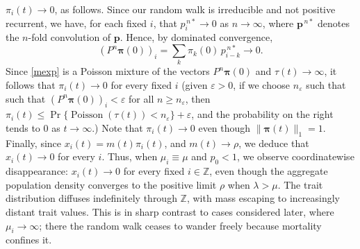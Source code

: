 \documentclass[12pt]{article}
\newcommand{\Z}{\ensuremath{\mathbb Z}}
\newcommand{\bp}{\boldsymbol{p}}
\newcommand{\bpi}{\boldsymbol{\pi}}
\begin{document}
$\pi_i(t)\to 0$, as follows.
Since our random walk is irreducible and not positive recurrent, 
we have, for each fixed $i$, that $p^{\,n*}_i \to 0$ as $n\to\infty$,
where $\bp^{\,n*}$ denotes the $n$-fold convolution of $\bp$.
Hence, by dominated convergence,
$$
(P^n\bpi(0))_i = \sum_k \pi_k(0)\,p^{\,n*}_{i-k} \to 0.
$$
Since \eqref{mexp} is a Poisson mixture of the vectors $P^n\bpi(0)$ and
$\tau(t)\to\infty$, it follows that $\pi_i(t)\to 0$ for every fixed $i$
(given $\varepsilon>0$, 
if we choose $n_\varepsilon$ 
such that such that
$(P^n\bpi(0))_i<\varepsilon$ for all $n\geq n_\varepsilon$, 
then $\pi_i(t)\leq
\Pr\{\operatorname{Poisson}(\tau(t))<n_\varepsilon\}+\varepsilon$, and the
probability on the right tends to $0$ as $t\to\infty$.) Note that
$\pi_i(t)\to 0$ even though $\|\bpi(t)\|_1=1$. Finally, since
$x_i(t)=m(t)\pi_i(t)$, and $m(t)\to \rho$, we deduce that $x_i(t)\to 0$
for every $i$. Thus, when $\mu_i\equiv\mu$ and $p_0<1$, we observe
coordinatewise disappearance: $x_i(t)\to 0$ for every fixed $i\in\Z$,
even though the aggregate population density converges to the positive
limit $\rho$ when $\lambda>\mu$. The trait distribution diffuses
indefinitely through $\Z$, with mass escaping to increasingly distant
trait values. This is in sharp contrast to cases considered later, where
$\mu_i\to\infty$; there the random walk ceases to wander freely because
mortality confines it.
\end{document}
